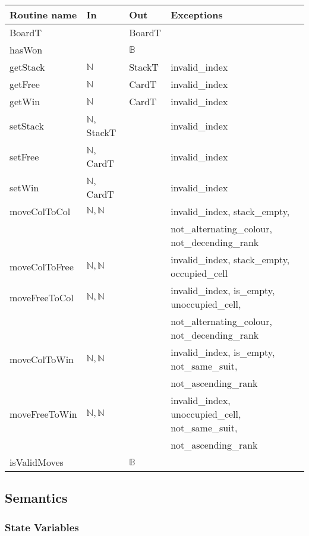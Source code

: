 \documentclass[12pt]{article}
\begin{document}
\begin{tabular}{| l | l | l | l |}
    \hline
    \textbf{Routine name} & \textbf{In} & \textbf{Out} & \textbf{Exceptions}\\
    \hline
    BoardT & ~ & BoardT & ~\\
    \hline
    hasWon & ~ & $\mathbb{B}$ & ~\\
    \hline
    getStack & $\mathbb{N}$ & StackT & invalid\_index\\
    \hline
    getFree & $\mathbb{N}$ & CardT & invalid\_index\\
    \hline
    getWin & $\mathbb{N}$ & CardT & invalid\_index\\
    \hline
    setStack & $\mathbb{N}$, StackT & ~ & invalid\_index\\
    \hline
    setFree & $\mathbb{N}$, CardT & ~ & invalid\_index\\
    \hline
    setWin & $\mathbb{N}$, CardT & ~ & invalid\_index\\
    \hline
    moveColToCol & $\mathbb{N},\mathbb{N}$ & ~ & invalid\_index, stack\_empty,\\
    & & & not\_alternating\_colour, not\_decending\_rank\\
    \hline
    moveColToFree & $\mathbb{N},\mathbb{N}$ & ~ & invalid\_index, stack\_empty, occupied\_cell\\
    \hline
    moveFreeToCol & $\mathbb{N},\mathbb{N}$ & ~ & invalid\_index, is\_empty, unoccupied\_cell, \\
    & & & not\_alternating\_colour, not\_decending\_rank\\
    \hline
    moveColToWin & $\mathbb{N},\mathbb{N}$ & ~ & invalid\_index, is\_empty, not\_same\_suit, \\
    & & &not\_ascending\_rank\\
    \hline
    moveFreeToWin & $\mathbb{N},\mathbb{N}$ & ~ & invalid\_index, unoccupied\_cell, not\_same\_suit,\\
    & & & not\_ascending\_rank\\
    \hline
    isValidMoves & ~ & $\mathbb{B}$ & ~\\
    \hline
\end{tabular}

\subsection* {Semantics}

\subsubsection* {State Variables}
\end{document}
